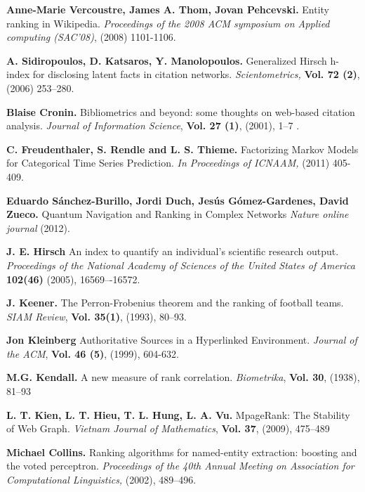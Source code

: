 \documentclass[10pt,leqno,twoside]{article}
\begin{document}
\vspace{-3ex}
\begin{thebibliography}{99}
\setlength{\parskip}{-3pt}\vspace{-2ex}

\textbf{Anne-Marie Vercoustre, James A. Thom, Jovan Pehcevski.}
Entity ranking in Wikipedia.
\textit{Proceedings of the 2008 ACM symposium on Applied computing (SAC'08)},
(2008) 1101-1106.

\textbf{A. Sidiropoulos, D. Katsaros, Y. Manolopoulos.}
Generalized Hirsch h-index for disclosing latent facts in citation networks.
\textit{Scientometrics,} \textbf{Vol. 72 (2)}, (2006) 253--280.

\textbf{Blaise Cronin.}
Bibliometrics and beyond: some thoughts on web-based citation analysis.
\textit{Journal of Information Science},
\textbf{Vol. 27 (1)}, (2001), 1--7 .


\textbf{C. Freudenthaler, S. Rendle and L. S. Thieme.}
Factorizing Markov Models for Categorical Time Series Prediction.
\textit{In Proceedings of ICNAAM, } (2011) 405-409.

\textbf{Eduardo Sánchez-Burillo, Jordi Duch, Jesús Gómez-Gardenes, David Zueco.}
Quantum Navigation and Ranking in Complex Networks
\textit{Nature online journal} (2012).

\textbf{J. E. Hirsch}
An index to quantify an individual's scientific research output.
\textit{Proceedings of the National Academy of Sciences of the United States of America} \textbf{102(46)}
(2005), 16569–-16572.


\textbf{J. Keener.}
The Perron-Frobenius theorem and the ranking of football teams.
\textit{SIAM Review}, \textbf{Vol. 35(1)}, (1993), 80--93.

\textbf{Jon Kleinberg}
Authoritative Sources in a Hyperlinked Environment.
\textit{Journal of the ACM}, \textbf{Vol. 46 (5)}, (1999), 604-632.


\textbf{M.G. Kendall.}
A new measure of rank correlation.
\textit{Biometrika}, \textbf{Vol. 30}, (1938), 81--93


\textbf{L. T. Kien, L. T. Hieu, T. L. Hung, L. A. Vu.}
MpageRank: The Stability of Web Graph.
\textit{Vietnam Journal of Mathematics}, \textbf{Vol. 37}, (2009), 475--489

\textbf{Michael Collins.}
Ranking algorithms for named-entity extraction: boosting and the voted perceptron.
\textit{Proceedings of the 40th Annual Meeting on Association for Computational Linguistics,}
(2002), 489--496.



\end{thebibliography}
\end{document}
